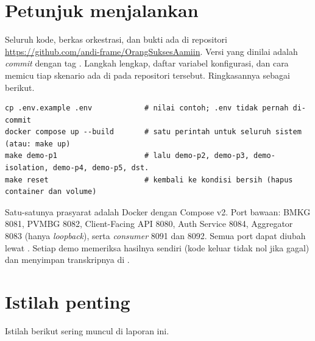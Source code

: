 \section{Petunjuk menjalankan}

Seluruh kode, berkas orkestrasi, dan bukti ada di repositori \url{https://github.com/andi-frame/OrangSuksesAamiin}. Versi yang
dinilai adalah \emph{commit} dengan tag . Langkah lengkap, daftar variabel konfigurasi, dan cara memicu tiap
skenario ada di  pada repositori tersebut. Ringkasannya sebagai berikut.

\begin{lstlisting}
cp .env.example .env            # nilai contoh; .env tidak pernah di-commit
docker compose up --build       # satu perintah untuk seluruh sistem (atau: make up)
make demo-p1                    # lalu demo-p2, demo-p3, demo-isolation, demo-p4, demo-p5, dst.
make reset                      # kembali ke kondisi bersih (hapus container dan volume)
\end{lstlisting}

Satu-satunya prasyarat adalah Docker dengan Compose v2. Port bawaan: BMKG 8081, PVMBG 8082, Client-Facing API 8080,
Auth Service 8084, Aggregator 8083 (hanya \emph{loopback}), serta \emph{consumer} 8091 dan 8092. Semua port dapat diubah lewat
. Setiap demo memeriksa hasilnya sendiri (kode keluar tidak nol jika gagal) dan menyimpan transkripnya di
.

\section{Istilah penting}

Istilah berikut sering muncul di laporan ini.

